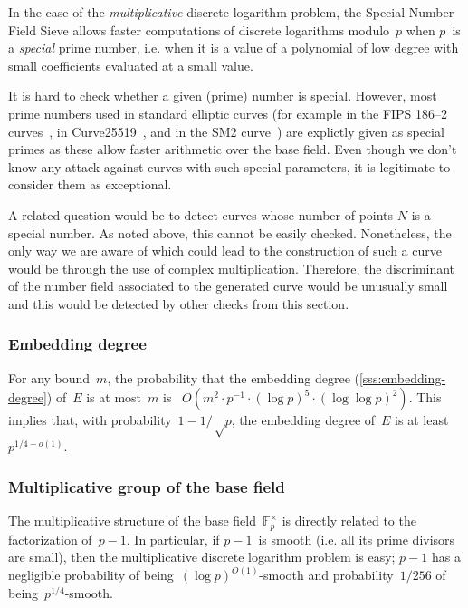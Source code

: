 \documentclass[twocolumn,letterpaper,10pt]{article}
\def\F{\mathbb{F}}
\begin{document}
In the case of the \emph{multiplicative} discrete logarithm problem,
the Special Number Field Sieve allows faster computations
of discrete logarithms modulo~$p$
when $p$~is a \emph{special} prime number,
i.e. when it is a value of a polynomial of low degree
with small coefficients evaluated at a small value.

It is hard to check whether a given (prime) number is special.
However, most prime numbers used in standard elliptic curves
(for example in the FIPS 186--2 curves~\cite{nist2000fips186-2},
in Curve25519~\cite{pkc2006bernstein},
and in the SM2 curve~\cite{oscca2010sm2})
are explictly given as special primes as these allow faster arithmetic
over the base field.
Even though we don't know any attack against curves with such special
parameters, it is legitimate to consider them as exceptional.

A related question would be to detect curves whose number of points $N$
is a special number.
As noted above, this cannot be easily checked.
Nonetheless, the only way we are aware of which could lead to the construction
of such a curve would be through the use of complex multiplication.
Therefore, the discriminant of the number field associated
to the generated curve would be unusually small and this would be detected by
other checks from this section.

\subsubsection{Embedding degree}

For any bound~$m$, the probability that
the embedding degree (\ref{sss:embedding-degree}) of~$E$ is at most~$m$
is~\cite{jc1998bk} $O(m^2 · p^{-1}·(\log p)^5·(\log\log p)^2)$.
This implies that, with probability~$1 - 1/√p$,
the embedding degree of~$E$ is at least~$p^{1/4 - o(1)}$.

\subsubsection{Multiplicative group of the base field}

The multiplicative structure of the base field~$\F_p^{×}$
is directly related to the factorization of~$p-1$.
In particular, if $p-1$~is smooth
(i.e. all its prime divisors are small),
then the multiplicative discrete logarithm problem is easy;
$p-1$ has a negligible probability
of being~$(\log p)^{O(1)}$-smooth
and probability~$1/256$ of being~$p^{1/4}$-smooth.
\end{document}
